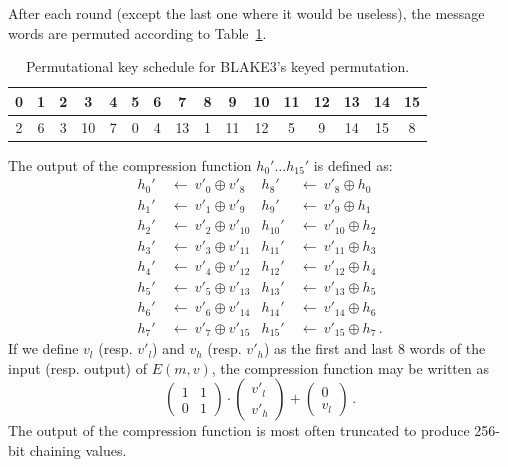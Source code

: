 \documentclass[11pt,notitlepage,a4paper]{article}
\begin{document}
After each round (except the last one where it would be useless), the message words are permuted according to Table~\ref{tab:perm}.

\begin{table}
  \centering
  \caption{Permutational key schedule for BLAKE3's keyed permutation.}\label{tab:perm}
  \begin{tabular}{cccccccccccccccc}
    \toprule
    0 & 1 & 2 & 3 & 4 & 5 & 6 & 7 & 8 & 9 & 10 & 11 & 12 & 13 & 14 & 15 \\ \midrule
    2 & 6 & 3 & 10 & 7 & 0 & 4 & 13 & 1 & 11 & 12 & 5 & 9 & 14 & 15 & 8 \\
    \bottomrule
  \end{tabular}
\end{table}

The output of the compression function $h_{0}' \ldots h_{15}'$ is
defined as:
\begin{align*}
h_{0}'  \ & \leftarrow \ v'_{0} \oplus  v'_{8} &
h_{8}'  \ & \leftarrow \ v'_{8} \oplus  h_{0} \\
h_{1}'  \ & \leftarrow \ v'_{1} \oplus  v'_{9} &
h_{9}'  \ & \leftarrow \ v'_{9} \oplus  h_{1} \\
h_{2}'  \ & \leftarrow \ v'_{2} \oplus  v'_{10} &
h_{10}' \ & \leftarrow \ v'_{10} \oplus  h_{2} \\
h_{3}'  \ & \leftarrow \ v'_{3} \oplus  v'_{11} &
h_{11}' \ & \leftarrow \ v'_{11} \oplus  h_{3} \\
h_{4}'  \ & \leftarrow \ v'_{4} \oplus  v'_{12} &
h_{12}' \ & \leftarrow \ v'_{12} \oplus  h_{4} \\
h_{5}'  \ & \leftarrow \ v'_{5} \oplus  v'_{13} &
h_{13}' \ & \leftarrow \ v'_{13} \oplus  h_{5} \\
h_{6}'  \ & \leftarrow \ v'_{6} \oplus  v'_{14} &
h_{14}' \ & \leftarrow \ v'_{14} \oplus  h_{6} \\
h_{7}'  \ & \leftarrow \ v'_{7} \oplus  v'_{15} &
h_{15}' \ & \leftarrow \ v'_{15} \oplus  h_{7}\,.
\end{align*}
If we define $v_l$ (resp. $v'_l$) and $v_h$ (resp. $v'_h$) as the first and last 8 words of the input (resp. output) of $E(m, v)$, the compression function may be written as
\[
  \begin{pmatrix}
    1 & 1 \\
    0 & 1
  \end{pmatrix}\cdot%
  \begin{pmatrix}
  v'_l \\ v'_h
  \end{pmatrix} + 
  \begin{pmatrix}
   0 \\ v_l
  \end{pmatrix}\,.
\]
The output of the compression function is most often truncated to produce 256-bit chaining values. %
\end{document}
